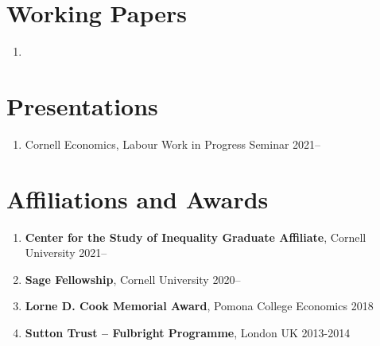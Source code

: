 \documentclass[letterpaper,11pt,oneside]{article}
\begin{document}

\section*{Working Papers}
\begin{enumerate}[itemsep=2.5pt, label={}]
    \item {}
\end{enumerate}


 
\section*{Presentations}
\begin{enumerate}[noitemsep, label={}]
    \item Cornell Economics, Labour Work in Progress Seminar 2021--
\end{enumerate}

\section*{Affiliations and Awards}
\begin{enumerate}[itemsep=2pt, label={}]
    \item \textbf{Center for the Study of Inequality Graduate Affiliate}, Cornell University 2021--
    \item \textbf{Sage Fellowship}, Cornell University 2020--
    \item \textbf{Lorne D. Cook Memorial Award}, Pomona College Economics 2018
    \item \textbf{Sutton Trust -- Fulbright Programme}, London UK 2013-2014  
\end{enumerate}
\end{document}
